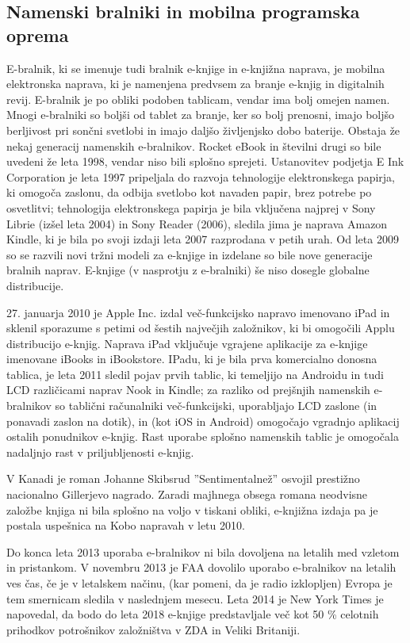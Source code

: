 \documentclass[a4paper, 12pt]{book}
\begin{document}
\subsection{Namenski bralniki in mobilna programska oprema}
\label{eknjiga_namenskiBralniki}
E-bralnik, ki se imenuje tudi bralnik e-knjige in e-knjižna naprava, je mobilna elektronska naprava, ki je namenjena predvsem za branje e-knjig in digitalnih revij. E-bralnik je po obliki podoben tablicam, vendar ima bolj omejen namen. Mnogi e-bralniki so boljši od tablet za branje, ker so bolj prenosni, imajo boljšo berljivost pri sončni svetlobi in imajo daljšo življenjsko dobo baterije. \cite{23} Obstaja že nekaj generacij namenskih e-bralnikov. Rocket eBook \cite{24} in številni drugi so bile uvedeni že leta 1998, vendar niso bili splošno sprejeti. Ustanovitev podjetja E Ink Corporation je leta 1997 pripeljala do razvoja tehnologije elektronskega papirja, ki omogoča zaslonu, da odbija svetlobo kot navaden papir, brez potrebe po osvetlitvi; tehnologija elektronskega papirja je bila vključena najprej v Sony Librie (izšel leta 2004) in Sony Reader (2006), sledila jima je naprava Amazon Kindle, ki je bila po svoji izdaji leta 2007 razprodana v petih urah. Od leta 2009 so se razvili novi tržni modeli za e-knjige in izdelane so bile nove generacije bralnih naprav. E-knjige (v nasprotju z e-bralniki) še niso dosegle globalne distribucije. 

27. januarja 2010 je Apple Inc. izdal več-funkcijsko napravo imenovano iPad \cite{26} in sklenil sporazume s petimi od šestih največjih založnikov, ki bi omogočili Applu distribucijo e-knjig. \cite{27} Naprava iPad vključuje vgrajene aplikacije za e-knjige imenovane iBooks in iBookstore. IPadu, ki je bila prva komercialno donosna tablica, je leta 2011 sledil pojav prvih tablic, ki temeljijo na Androidu in tudi LCD različicami naprav Nook in Kindle; za razliko od prejšnjih namenskih e-bralnikov so tablični računalniki več-funkcijski, uporabljajo LCD zaslone (in ponavadi zaslon na dotik), in (kot iOS in Android) omogočajo vgradnjo aplikacij ostalih ponudnikov e-knjig. Rast uporabe splošno namenskih tablic je omogočala nadaljnjo rast v priljubljenosti e-knjig.

V Kanadi je roman Johanne Skibsrud ''Sentimentalnež'' osvojil prestižno nacionalno Gillerjevo nagrado. Zaradi majhnega obsega romana neodvisne založbe knjiga ni bila splošno na voljo v tiskani obliki, e-knjižna izdaja pa je postala uspešnica na Kobo napravah v letu 2010. \cite{28}

Do konca leta 2013 uporaba e-bralnikov ni bila dovoljena na letalih med vzletom in pristankom. \cite{29} V novembru 2013 je FAA dovolilo uporabo e-bralnikov na letalih ves čas, če je v letalskem načinu, (kar pomeni, da je radio izklopljen) Evropa je tem smernicam sledila v naslednjem mesecu. \cite{30} Leta 2014 je New York Times je napovedal, da bodo do leta 2018 e-knjige predstavljale več kot 50 \% celotnih prihodkov potrošnikov založništva v ZDA in Veliki Britaniji. \cite{31}
\end{document}
